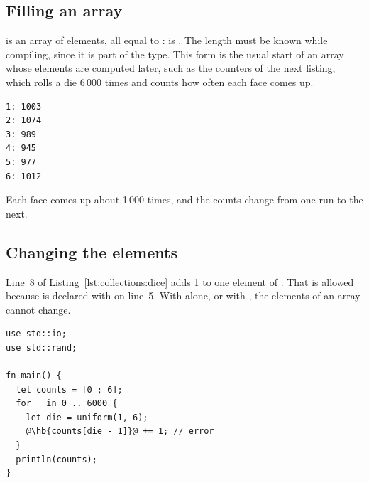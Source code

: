 
\subsection{Filling an array}

\token{[v ; n]} is an array of  elements, all equal to :
\token{[0 ; 6]} is \token{[0, 0, 0, 0, 0, 0]}. The length must be known while
compiling, since it is part of the type. This form is the usual start of an
array whose elements are computed later, such as the counters of the next
listing, which rolls a die 6\,000 times and counts how often each face comes up.


\vspace{-10pt}%
\begin{lstlisting}[style=bashVerb]
1: 1003
2: 1074
3: 989
4: 945
5: 977
6: 1012
\end{lstlisting}

Each face comes up about 1\,000 times, and the counts change from one run to the
next.

\subsection{Changing the elements}
\label{sec:collections:dmut}

Line~8 of Listing~\ref{lst:collections:dice} adds 1 to one element of
. That is allowed because  is declared with
 on line~5. With  alone, or with , the
elements of an array cannot change.

\begin{lstlisting}[style=coloredverbatimError, escapechar=@, caption=Changing an element of an array declared with \token{let}]
use std::io;
use std::rand;

fn main() {
  let counts = [0 ; 6];
  for _ in 0 .. 6000 {
    let die = uniform(1, 6);
    @\hb{counts[die - 1]}@ += 1; // error
  }
  println(counts);
}
\end{lstlisting}

